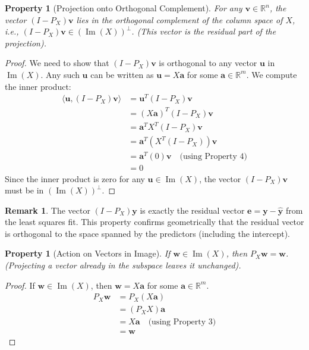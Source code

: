 \documentclass[11pt]{article}
\newtheorem{property}[theorem]{Property}
\theoremstyle{definition}
\newtheorem{remark}[theorem]{Remark}
\DeclareMathOperator{\Image}{Im} %
\newcommand{\vect}[1]{\mathbf{#1}} %
\begin{document}
\begin{property}[Projection onto Orthogonal Complement]
For any $\vect{v} \in \mathbb{R}^n$, the vector $(I - P_X)\vect{v}$ lies in the orthogonal complement of the column space of $X$, i.e., $(I - P_X)\vect{v} \in (\Image(X))^{\perp}$. (This vector is the residual part of the projection).
\end{property}
\begin{proof}
We need to show that $(I - P_X)\vect{v}$ is orthogonal to any vector $\vect{u}$ in $\Image(X)$. Any such $\vect{u}$ can be written as $\vect{u} = X\vect{a}$ for some $\vect{a} \in \mathbb{R}^m$. We compute the inner product:
\begin{align*}
\langle \vect{u}, (I - P_X)\vect{v} \rangle &= \vect{u}^T (I - P_X)\vect{v} \\
&= (X\vect{a})^T (I - P_X)\vect{v} \\
&= \vect{a}^T X^T (I - P_X)\vect{v} \\
&= \vect{a}^T (X^T (I - P_X)) \vect{v} \\
&= \vect{a}^T (0) \vect{v} \quad \text{(using Property 4)} \\
&= 0
\end{align*}
Since the inner product is zero for any $\vect{u} \in \Image(X)$, the vector $(I - P_X)\vect{v}$ must be in $(\Image(X))^{\perp}$.
\end{proof}
\begin{remark}
The vector $(I-P_X)\vect{y}$ is exactly the residual vector $\vect{e} = \vect{y} - \hat{\vect{y}}$ from the least squares fit. This property confirms geometrically that the residual vector is orthogonal to the space spanned by the predictors (including the intercept).
\end{remark}

\begin{property}[Action on Vectors in Image]
If $\vect{w} \in \Image(X)$, then $P_X \vect{w} = \vect{w}$. (Projecting a vector already in the subspace leaves it unchanged).
\end{property}
\begin{proof}
If $\vect{w} \in \Image(X)$, then $\vect{w} = X\vect{a}$ for some $\vect{a} \in \mathbb{R}^m$.
\begin{align*}
P_X \vect{w} &= P_X (X\vect{a}) \\
&= (P_X X) \vect{a} \\
&= X \vect{a} \quad \text{(using Property 3)} \\
&= \vect{w}
\end{align*}
\end{proof}
\end{document}
